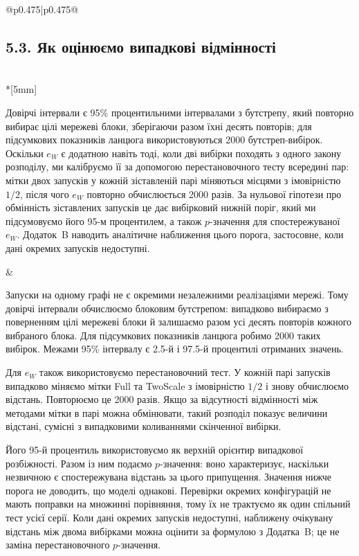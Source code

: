 \documentclass[11pt]{article}
\newcommand{\Full}{\textnormal{Full}}
\newcommand{\TS}{\textnormal{TwoScale}}
\newcommand{\eW}{e_W}
\begin{document}
\begin{longtable}{@{}p{0.475\textwidth}|p{0.475\textwidth}@{}}
\begin{minipage}[t]{\linewidth}
\subsection*{5.3. Як оцінюємо випадкові відмінності}
\end{minipage} \\*[5mm]
\begin{minipage}[t]{\linewidth}
Довірчі інтервали є 95\% процентильними інтервалами з бутстрепу, який повторно вибирає цілі мережеві блоки, зберігаючи разом їхні десять повторів; для підсумкових показників ланцюга використовуються 2000 бутстреп-вибірок. Оскільки $\eW$ є додатною навіть тоді, коли дві вибірки походять з одного закону розподілу, ми калібруємо її за допомогою перестановочного тесту всередині пар: мітки двох запусків у кожній зіставленій парі міняються місцями з імовірністю $1/2$, після чого $\eW$ повторно обчислюється 2000 разів. За нульової гіпотези про обмінність зіставлених запусків це дає вибірковий нижній поріг, який ми підсумовуємо його 95-м процентилем, а також $p$-значення для спостережуваної $\eW$. Додаток~B наводить аналітичне наближення цього порога, застосовне, коли дані окремих запусків недоступні.
\end{minipage} &
\begin{minipage}[t]{\linewidth}
Запуски на одному графі не є окремими незалежними реалізаціями мережі. Тому довірчі інтервали обчислюємо блоковим бутстрепом: випадково вибираємо з поверненням цілі мережеві блоки й залишаємо разом усі десять повторів кожного вибраного блока. Для підсумкових показників ланцюга робимо 2000 таких вибірок. Межами 95\% інтервалу є 2.5-й і 97.5-й процентилі отриманих значень.
\par Для $\eW$ також використовуємо перестановочний тест. У кожній парі запусків випадково міняємо мітки \Full{} та \TS{} з імовірністю $1/2$ і знову обчислюємо відстань. Повторюємо це 2000 разів. Якщо за відсутності відмінності між методами мітки в парі можна обмінювати, такий розподіл показує величини відстані, сумісні з випадковими коливаннями скінченної вибірки.
\par Його 95-й процентиль використовуємо як верхній орієнтир випадкової розбіжності. Разом із ним подаємо $p$-значення: воно характеризує, наскільки незвичною є спостережувана відстань за цього припущення. Значення нижче порога не доводить, що моделі однакові. Перевірки окремих конфігурацій не мають поправки на множинні порівняння, тому їх не трактуємо як один спільний тест усієї серії. Коли дані окремих запусків недоступні, наближену очікувану відстань між двома вибірками можна оцінити за формулою з Додатка~B; це не заміна перестановочного $p$-значення.

\end{minipage}
\end{longtable}
\end{document}
